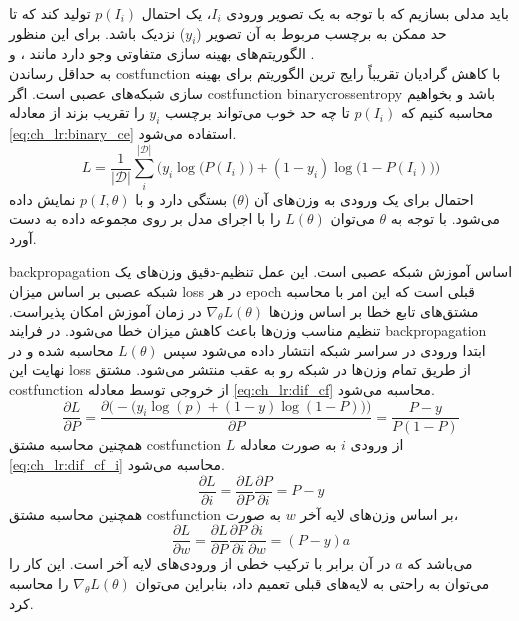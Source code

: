 باید مدلی بسازیم که با توجه به یک تصویر ورودی $I_i$، یک احتمال $p(I_i)$ تولید کند که تا حد ممکن به برچسب مربوط به آن تصویر ($y_i$) نزدیک باشد. برای این منظور الگوریتم‌های بهینه سازی متفاوتی وجو دارد مانند ،  و 
.\\
به حداقل رساندن \gls{costfunction} با کاهش گرادیان تقریباً رایج ترین الگوریتم برای بهینه سازی شبکه‌‌های عصبی است. اگر \gls{costfunction} \gls{binarycrossentropy} باشد و بخواهیم محاسبه کنیم که $p(I_i)$ تا چه حد خوب می‌تواند برچسب $y_i$ را تقریب بزند از معادله \ref{eq:ch_lr:binary_ce} استفاده می‌شود.
\begin{equation}
	L = \frac{1}{|\mathcal{D}|}  \sum_i^{|\mathcal{D}|}\Big(y_i \log\big(P(I_i)\big) + (1-y_i) \log\big(1-P(I_i)\big)\Big)
	\label{eq:ch_lr:binary_ce}
\end{equation}
احتمال برای یک ورودی به وزن‌های آن ($\theta$) بستگی دارد و با
$p(I, \theta)$ 
نمایش داده می‌شود. با توجه به $\theta$ می‌توان $L(\theta)$ را با اجرای مدل بر روی مجموعه داده به دست آورد.

\gls{backpropagation}
اساس آموزش شبکه عصبی است. این عمل تنظیم-دقیق  وزن‌های یک شبکه عصبی بر اساس میزان \gls{loss} در هر \gls{epoch} قبلی است که این امر با محاسبه مشتق‌های تابع خطا بر اساس وزن‌ها 
$\nabla_\theta L(\theta)$
در زمان آموزش امکان پذیراست. تنظیم مناسب وزن‌ها  باعث کاهش میزان خطا می‌شود. در فرایند \gls{backpropagation}  ابتدا ورودی در سراسر شبکه انتشار داده می‌شود سپس $L(\theta)$ محاسبه شده و در نهایت این \gls{loss} از طریق تمام وزن‌ها در شبکه رو به عقب منتشر می‌شود. مشتق \gls{costfunction} از خروجی توسط معادله \ref{eq:ch_lr:dif_cf} محاسبه می‌شود.
\begin{equation}
	\frac{\partial L}{\partial P} = \frac{\partial \Big(-\big(y_i \log(p) + (1-y)\log(1-P)\big)\Big)}{\partial P} = \frac{P-y}{P(1-P)}
	\label{eq:ch_lr:dif_cf}
\end{equation}
همچنین محاسبه مشتق \gls{costfunction} $L$ از ورودی $i$ به صورت معادله \ref{eq:ch_lr:dif_cf_i} محاسبه می‌شود.
\begin{equation}
	\frac{\partial L}{\partial i} = \frac{\partial L}{\partial P} \frac{\partial P}{\partial i} = P-y
	\label{eq:ch_lr:dif_cf_i}
\end{equation}
همچنین محاسبه مشتق \gls{costfunction} بر اساس وزن‌های لایه آخر $w$ به صورت، 
\begin{equation}
	\frac{\partial L}{\partial w} = \frac{\partial L}{\partial P} \frac{\partial P}{\partial i}  \frac{\partial i}{\partial w}= (P-y)a
	\label{eq:ch_lr:dif_cf_w}
\end{equation}
می‌باشد که $a$ در آن برابر با ترکیب خطی از ورودی‌های لایه آخر است. این کار را می‌توان به راحتی به لایه‌های قبلی تعمیم داد، بنابراین می‌توان $\nabla _\theta L(\theta)$ را محاسبه کرد.